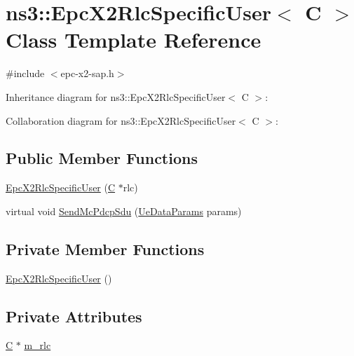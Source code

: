 \hypertarget{classns3_1_1EpcX2RlcSpecificUser}{}\section{ns3\+:\+:Epc\+X2\+Rlc\+Specific\+User$<$ C $>$ Class Template Reference}
\label{classns3_1_1EpcX2RlcSpecificUser}


{\ttfamily \#include $<$epc-\/x2-\/sap.\+h$>$}



Inheritance diagram for ns3\+:\+:Epc\+X2\+Rlc\+Specific\+User$<$ C $>$\+:


Collaboration diagram for ns3\+:\+:Epc\+X2\+Rlc\+Specific\+User$<$ C $>$\+:
\subsection*{Public Member Functions}
\begin{DoxyCompactItemize}
\item 
\hyperlink{classns3_1_1EpcX2RlcSpecificUser_a08ccd91921891edf467d60e2eb82c211}{Epc\+X2\+Rlc\+Specific\+User} (\hyperlink{loss__COST231__small__cities__urban_8m_aaa53ca0b650dfd85c4f59fa156f7a2cc}{C} $\ast$rlc)
\item 
virtual void \hyperlink{classns3_1_1EpcX2RlcSpecificUser_a1c0e17178d5f72972a744bf3dab6cb61}{Send\+Mc\+Pdcp\+Sdu} (\hyperlink{structns3_1_1EpcX2Sap_1_1UeDataParams}{Ue\+Data\+Params} params)
\end{DoxyCompactItemize}
\subsection*{Private Member Functions}
\begin{DoxyCompactItemize}
\item 
\hyperlink{classns3_1_1EpcX2RlcSpecificUser_a3011e398bb40fa25c3eb9447ecc207eb}{Epc\+X2\+Rlc\+Specific\+User} ()
\end{DoxyCompactItemize}
\subsection*{Private Attributes}
\begin{DoxyCompactItemize}
\item 
\hyperlink{loss__COST231__small__cities__urban_8m_aaa53ca0b650dfd85c4f59fa156f7a2cc}{C} $\ast$ \hyperlink{classns3_1_1EpcX2RlcSpecificUser_a1867010f3c6ac32e67ba1bdc414ebeff}{m\+\_\+rlc}
\end{DoxyCompactItemize}
